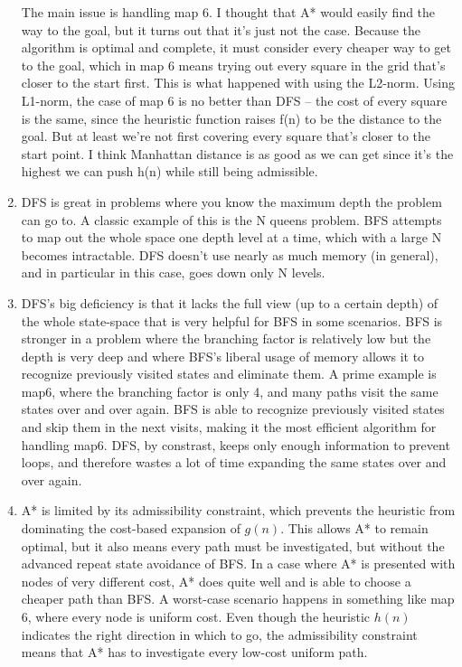 \documentclass[11pt]{article}
\begin{document}
\begin{enumerate}
The main issue is handling map 6. I thought that A* would easily find the way to the goal, but it turns out that it's just not the case. Because the algorithm is optimal and complete, it must consider every cheaper way to get to the goal, which in map 6 means trying out every square in the grid that's closer to the start first. This is what happened with using the L2-norm. Using L1-norm, the case of map 6 is no better than DFS -- the cost of every square is the same, since the heuristic function raises f(n) to be the distance to the goal. But at least we're not first covering every square that's closer to the start point. I think Manhattan distance is as good as we can get since it's the highest we can push h(n) while still being admissible.

\item DFS is great in problems where you know the maximum depth the problem can go to. A classic example of this is the N queens problem. BFS attempts to map out the whole space one depth level at a time, which with a large N becomes intractable. DFS doesn't use nearly as much memory (in general), and in particular in this case, goes down only N levels.

\item DFS's big deficiency is that it lacks the full view (up to a certain depth) of the whole state-space that is very helpful for BFS in some scenarios. BFS is stronger in a problem where the branching factor is relatively low but the depth is very deep and where BFS's liberal usage of memory allows it to recognize previously visited states and eliminate them. A prime example is map6, where the branching factor is only 4, and many paths visit the same states over and over again. BFS is able to recognize previously visited states and skip them in the next visits, making it the most efficient algorithm for handling map6. DFS, by constrast, keeps only enough information to prevent loops, and therefore wastes a lot of time expanding the same states over and over again.

\item A* is limited by its admissibility constraint, which prevents the heuristic from dominating the cost-based expansion of $g(n)$. This allows A* to remain optimal, but it also means every path must be investigated, but without the advanced repeat state avoidance of BFS. In a case where A* is presented with nodes of very different cost, A* does quite well and is able to choose a cheaper path than BFS. A worst-case scenario happens in something like map 6, where every node is uniform cost. Even though the heuristic $h(n)$ indicates the right direction in which to go, the admissibility constraint means that A* has to investigate every low-cost uniform path.


\end{enumerate}
\end{document}
